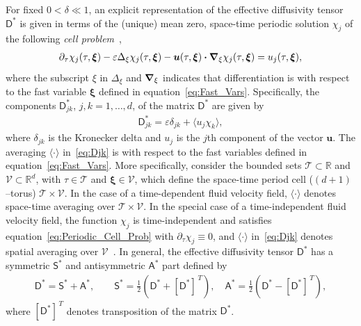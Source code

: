 \documentclass[leqno,onefignum,onetabnum]{siamltex1213}
\newcommand{\Tc}{\mathcal{T}}
\newcommand{\Vc}{\mathcal{V}}
\newcommand{\Dm}{\mathsf{D}}
\newcommand{\Sm}{\mathsf{S}}
\newcommand{\Am}{\mathsf{A}}
\newcommand\bnabla{\mbox{\boldmath${\nabla}$}}
\providecommand\bcdot{\boldsymbol{\cdot}}
\newcommand{\vecu}{\boldsymbol{u}}
\newcommand{\vecxi}{\boldsymbol{\xi}}
\begin{document}
For fixed $0<\delta\ll1$, an explicit representation of the
effective diffusivity tensor $\Dm^*$ is given in terms of the (unique)
mean zero, space-time periodic solution $\chi_j$ of the following
\emph{cell problem}~\cite{Biferale:PF:2725,Majda:Kramer:1999:book}, 
%
\begin{align}\label{eq:Periodic_Cell_Prob}
  \partial_\tau\chi_j(\tau,\vecxi)
  -\varepsilon\Delta_\xi\chi_j(\tau,\vecxi)
  -\vecu(\tau,\vecxi) \bcdot\bnabla_\xi \chi_j(\tau,\vecxi)
  =u_j(\tau,\vecxi),
\end{align}
%
where the subscript $\xi$ in $\Delta_\xi$ and $\bnabla_\xi$
indicates that differentiation is with respect to the fast variable
$\vecxi$ defined in equation~\eqref{eq:Fast_Vars}. Specifically,
the components $\Dm^*_{jk}$, $j,k=1,\ldots,d$, of the matrix $\Dm^*$ are given
by~\cite{McLaughlin:SIAM_JAM:780,Fannjiang:1994:SIAM_JAM:333,Majda:Kramer:1999:book}          
%
\begin{align}\label{eq:Djk}
  \Dm^*_{jk}=\varepsilon\delta_{jk}+\langle u_j\chi_k\rangle,
\end{align}
%
where $\delta_{jk}$ is the Kronecker delta and $u_j$ is the $j$th component
of the vector $\vecu$. The averaging $\langle\cdot\rangle$ in~\eqref{eq:Djk} is with
respect to the fast variables defined in
equation~\eqref{eq:Fast_Vars}. More specifically, consider the bounded
sets  $\Tc\subset\mathbb{R}$ and $\Vc\subset\mathbb{R}^d$, with $\tau\in\Tc$ and
$\vecxi\in\Vc$, which define the space-time period cell ($(d+1)$--torus)
$\Tc\times\Vc$. In the case of a time-dependent fluid velocity field, $\langle\cdot\rangle$
denotes space-time averaging over $\Tc\times\Vc$. In the special case of a
time-independent fluid velocity field, the function $\chi_j$ is
time-independent and satisfies equation~\eqref{eq:Periodic_Cell_Prob}
with $\partial_\tau\chi_j\equiv0$, and $\langle\cdot\rangle$ in~\eqref{eq:Djk} denotes spatial averaging over
$\Vc$~\cite{Fannjiang:1994:SIAM_JAM:333,Majda:Kramer:1999:book}. In
general, the effective diffusivity tensor $\Dm^*$ has a symmetric
$\Sm^*$ and antisymmetric $\Am^*$ part defined by 
%
\begin{align}\label{eq:Symm_Anti-Symm}
  \Dm^*=\Sm^*+\Am^*,\qquad
  \Sm^*=\frac{1}{2}\left(\Dm^*+[\Dm^*]^{\,T}\right), \quad
  \Am^*=\frac{1}{2}\left(\Dm^*-[\Dm^*]^{\,T}\right),
\end{align}
%
where $[\Dm^*]^{\,T}$ denotes transposition of the matrix $\Dm^*$.
\end{document}
